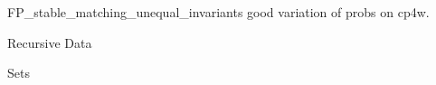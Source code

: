 \documentclass[quiz]{mcs}
\begin{document}


\examspace

\begin{staffnotes}
FP\_stable\_matching\_unequal\_invariants good variation of probs on cp4w.
\end{staffnotes}

\begin{staffnotes}
\begin{center}
{\large Recursive Data}
\end{center}
\end{staffnotes}




\examspace



\begin{staffnotes}
\begin{center}
{\large Sets}
\end{center}
\end{staffnotes}


\examspace

%
%
%
%


\end{document}
